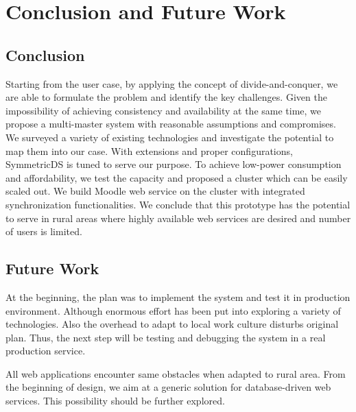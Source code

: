 \chapter{Conclusion and Future Work}\label{conclusion}
\section{Conclusion}
Starting from the user case, by applying the concept of divide-and-conquer, we are able to formulate the problem and identify the key challenges. Given the impossibility of achieving consistency and availability at the same time, we propose a multi-master system with reasonable assumptions and compromises. We surveyed a variety of existing technologies and investigate the potential to map them into our case. With extensions and proper configurations, SymmetricDS is tuned to serve our purpose. To achieve low-power consumption and affordability, we test the capacity and proposed a cluster which can be easily scaled out. We build Moodle web service on the cluster with integrated synchronization functionalities. We conclude that this prototype has the potential to serve in rural areas where highly available web services are desired and number of users is limited.

\section{Future Work}
At the beginning, the plan was to implement the system and test it in production environment. Although enormous effort has been put into exploring a variety of technologies. Also the overhead to adapt to local work culture disturbs original plan. Thus, the next step will be testing and debugging the system in a real production service.

All web applications encounter same obstacles when adapted to rural area. From the beginning of design, we aim at a generic solution for database-driven web services. This possibility should be further explored.
